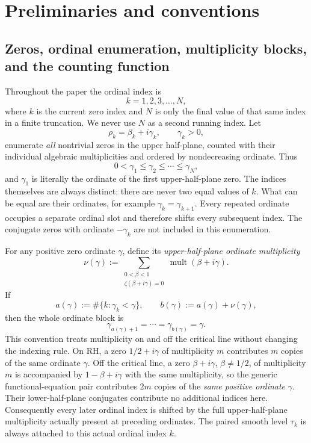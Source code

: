 \documentclass[11pt]{amsart}
\numberwithin{equation}{section}
\theoremstyle{definition}
\theoremstyle{remark}
\begin{document}
\section{Preliminaries and conventions}\label{sec:prelim}

\subsection{Zeros, ordinal enumeration, multiplicity blocks, and the counting function}
Throughout the paper the ordinal index is
\[
\boxed{k=1,2,3,\ldots,N,}
\]
where \(k\) is the current zero index and \(N\) is only the final value of that same index in a finite truncation. We never use \(N\) as a second running index. Let
\[
\rho_k=\beta_k+i\gamma_k,\qquad \gamma_k>0,
\]
enumerate \emph{all} nontrivial zeros in the upper half-plane, counted with their individual algebraic multiplicities and ordered by nondecreasing ordinate. Thus
\[
0<\gamma_1\leq\gamma_2\leq\cdots\leq\gamma_N,
\]
and \(\gamma_1\) is literally the ordinate of the first upper-half-plane zero. The indices themselves are always distinct: there are never two equal values of \(k\). What can be equal are their ordinates, for example \(\gamma_k=\gamma_{k+1}\). Every repeated ordinate occupies a separate ordinal slot and therefore shifts every subsequent index. The conjugate zeros with ordinate \(-\gamma_k\) are not included in this enumeration.

For any positive zero ordinate \(\gamma\), define its \emph{upper-half-plane ordinate multiplicity}
\begin{equation}\label{eq:ordinate_multiplicity}
\nu(\gamma):=
\sum_{\substack{0<\beta<1\\ \zeta(\beta+i\gamma)=0}}
\operatorname{mult}(\beta+i\gamma).
\end{equation}
If
\[
a(\gamma):=\#\{k:\gamma_k<\gamma\},
\qquad
b(\gamma):=a(\gamma)+\nu(\gamma),
\]
then the whole ordinate block is
\begin{equation}\label{eq:ordinate_block_indices}
\gamma_{a(\gamma)+1}=\cdots=\gamma_{b(\gamma)}=\gamma.
\end{equation}
This convention treats multiplicity on and off the critical line without changing the indexing rule. On RH, a zero \(1/2+i\gamma\) of multiplicity \(m\) contributes \(m\) copies of the same ordinate \(\gamma\). Off the critical line, a zero \(\beta+i\gamma\), \(\beta\ne1/2\), of multiplicity \(m\) is accompanied by \(1-\beta+i\gamma\) with the same multiplicity, so the generic functional-equation pair contributes \(2m\) copies of the \emph{same positive ordinate} \(\gamma\). Their lower-half-plane conjugates contribute no additional indices here. Consequently every later ordinal index is shifted by the full upper-half-plane multiplicity actually present at preceding ordinates. The paired smooth level \(\tau_k\) is always attached to this actual ordinal index \(k\).
\end{document}
